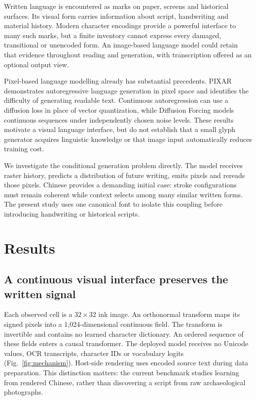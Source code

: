Written language is encountered as marks on paper, screens and historical
surfaces. Its visual form carries information about script, handwriting and
material history. Modern character encodings provide a powerful interface to
many such marks, but a finite inventory cannot express every damaged,
transitional or unencoded form. An image-based language model could retain
that evidence throughout reading and generation, with transcription offered
as an optional output view.

Pixel-based language modelling already has substantial precedents.
PIXAR demonstrates autoregressive language generation in pixel space and
identifies the difficulty of generating readable text\cite{pixar}. Continuous
autoregression can use a diffusion loss in place of vector quantization\cite{mar},
while Diffusion Forcing models continuous sequences under independently chosen
noise levels\cite{forcing}. These results motivate a visual language interface,
but do not establish that a small glyph generator acquires linguistic
knowledge or that image input automatically reduces training cost.

We investigate the conditional generation problem directly. The model
receives raster history, predicts a distribution of future writing, emits
pixels and rereads those pixels. Chinese provides a demanding initial case:
stroke configurations must remain coherent while context selects among many
similar written forms. The present study uses one canonical font to isolate
this coupling before introducing handwriting or historical scripts.

\section*{Results}
\subsection*{A continuous visual interface preserves the written signal}
Each observed cell is a $32\times32$ ink image. An orthonormal transform maps
its signed pixels into a 1,024-dimensional continuous field. The transform is
invertible and contains no learned character dictionary. An ordered sequence
of these fields enters a causal transformer. The deployed model receives no
Unicode values, OCR transcripts, character IDs or vocabulary logits
(Fig.~\ref{fig:mechanism}). Host-side rendering uses encoded source text during
data preparation. This distinction matters: the current benchmark studies
learning from rendered Chinese, rather than discovering a script from raw
archaeological photographs.

